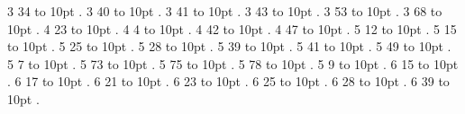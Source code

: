 
\pdfpagewidth=148mm
\pdfpageheight=210mm
\hsize=128mm
\vsize=190mm

\pdfhorigin=0pt
\pdfvorigin=0pt
\hoffset=10mm
\voffset=10mm
 3 34 \leaders\hbox to 10pt {\hss.\hss}  \hfill {}
\smallskip
{} 3 40 \leaders\hbox to 10pt {\hss.\hss}  \hfill {}
\smallskip
{} 3 41 \leaders\hbox to 10pt {\hss.\hss}  \hfill {}
\smallskip
{} 3 43 \leaders\hbox to 10pt {\hss.\hss}  \hfill {}
\smallskip
{} 3 53 \leaders\hbox to 10pt {\hss.\hss}  \hfill {}
\smallskip
{} 3 68 \leaders\hbox to 10pt {\hss.\hss}  \hfill {}
\smallskip
{} 4 23 \leaders\hbox to 10pt {\hss.\hss}  \hfill {}
\smallskip
{} 4 4 \leaders\hbox to 10pt {\hss.\hss}  \hfill {}
\smallskip
{} 4 42 \leaders\hbox to 10pt {\hss.\hss}  \hfill {}
\smallskip
{} 4 47 \leaders\hbox to 10pt {\hss.\hss}  \hfill {}
\smallskip
{} 5 12 \leaders\hbox to 10pt {\hss.\hss}  \hfill {}
\smallskip
{} 5 15 \leaders\hbox to 10pt {\hss.\hss}  \hfill {}
\smallskip
{} 5 25 \leaders\hbox to 10pt {\hss.\hss}  \hfill {}
\smallskip
{} 5 28 \leaders\hbox to 10pt {\hss.\hss}  \hfill {}
\smallskip
{} 5 39 \leaders\hbox to 10pt {\hss.\hss}  \hfill {}
\smallskip
{} 5 41 \leaders\hbox to 10pt {\hss.\hss}  \hfill {}
\smallskip
{} 5 49 \leaders\hbox to 10pt {\hss.\hss}  \hfill {}
\smallskip
{} 5 7 \leaders\hbox to 10pt {\hss.\hss}  \hfill {}
\smallskip
{} 5 73 \leaders\hbox to 10pt {\hss.\hss}  \hfill {}
\smallskip
{} 5 75 \leaders\hbox to 10pt {\hss.\hss}  \hfill {}
\smallskip
{} 5 78 \leaders\hbox to 10pt {\hss.\hss}  \hfill {}
\smallskip
{} 5 9 \leaders\hbox to 10pt {\hss.\hss}  \hfill {}
\smallskip
{} 6 15 \leaders\hbox to 10pt {\hss.\hss}  \hfill {}
\smallskip
{} 6 17 \leaders\hbox to 10pt {\hss.\hss}  \hfill {}
\smallskip
{} 6 21 \leaders\hbox to 10pt {\hss.\hss}  \hfill {}
\smallskip
{} 6 23 \leaders\hbox to 10pt {\hss.\hss}  \hfill {}
\smallskip
{} 6 25 \leaders\hbox to 10pt {\hss.\hss}  \hfill {}
\smallskip
{} 6 28 \leaders\hbox to 10pt {\hss.\hss}  \hfill {}
\smallskip
{} 6 39 \leaders\hbox to 10pt {\hss.\hss}  \hfill {}

